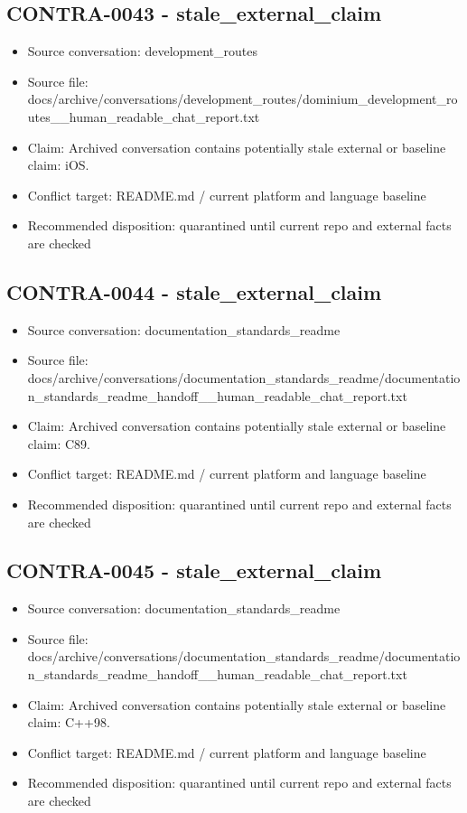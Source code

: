 \documentclass[11pt,a4paper]{report}
\begin{document}
\subsection{CONTRA-0043 - stale\_external\_claim}

\begin{itemize}
\item Source conversation: development\_routes
\item Source file: docs/archive/conversations/development\_routes/dominium\_development\_routes\_\_human\_readable\_chat\_report.txt
\item Claim: Archived conversation contains potentially stale external or baseline claim: iOS.
\item Conflict target: README.md / current platform and language baseline
\item Recommended disposition: quarantined until current repo and external facts are checked
\end{itemize}

\subsection{CONTRA-0044 - stale\_external\_claim}

\begin{itemize}
\item Source conversation: documentation\_standards\_readme
\item Source file: docs/archive/conversations/documentation\_standards\_readme/documentation\_standards\_readme\_handoff\_\_human\_readable\_chat\_report.txt
\item Claim: Archived conversation contains potentially stale external or baseline claim: C89.
\item Conflict target: README.md / current platform and language baseline
\item Recommended disposition: quarantined until current repo and external facts are checked
\end{itemize}

\subsection{CONTRA-0045 - stale\_external\_claim}

\begin{itemize}
\item Source conversation: documentation\_standards\_readme
\item Source file: docs/archive/conversations/documentation\_standards\_readme/documentation\_standards\_readme\_handoff\_\_human\_readable\_chat\_report.txt
\item Claim: Archived conversation contains potentially stale external or baseline claim: C++98.
\item Conflict target: README.md / current platform and language baseline
\item Recommended disposition: quarantined until current repo and external facts are checked
\end{itemize}
\end{document}
